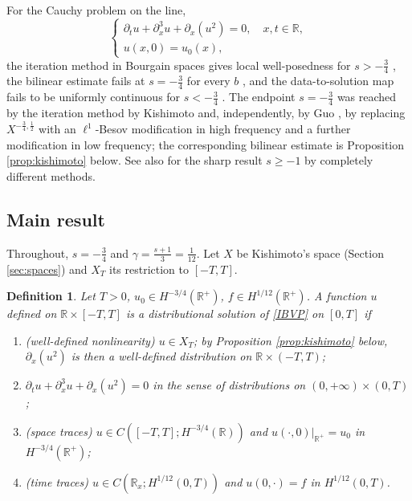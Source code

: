 \documentclass[10pt,reqno]{amsart}
\newtheorem{definition}[theorem]{Definition}
\theoremstyle{remark}
\numberwithin{equation}{section}
\newcommand{\R}{\mathbb R}
\newcommand{\pd}{\partial}
\newcommand{\ga}{\gamma}
\begin{document}
For the Cauchy problem on the line,
\begin{equation}\label{pure}
\left\{\begin{array}{l}
\partial_{t} u+\partial_{x}^{3} u+\pd_x( u^2)=0, \quad x, t \in \mathbb{R},  \\
u(x, 0)=u_{0}(x),
\end{array}\right.
\end{equation}
the iteration method in Bourgain spaces gives local well-posedness for $s>-\frac34$ \cite{KPV96}, the bilinear estimate fails at $s=-\frac34$ for every $b$ \cite{NTT}, and the data-to-solution map fails to be uniformly continuous for $s<-\frac34$ \cite{CCT}. The endpoint $s=-\frac34$ was reached by the iteration method by Kishimoto \cite{Kishimoto} and, independently, by Guo \cite{Guo}, by replacing $X^{-\frac34,\frac12}$ with an $\ell^1$-Besov modification in high frequency and a further modification in low frequency; the corresponding bilinear estimate is Proposition \ref{prop:kishimoto} below. See also \cite{Killip} for the sharp result $s\ge-1$ by completely different methods.

\subsection{Main result}

Throughout, $s=-\frac34$ and $\ga=\frac{s+1}{3}=\frac1{12}$. Let $X$ be Kishimoto's space (Section \ref{sec:spaces}) and $X_T$ its restriction to $[-T,T]$.

\begin{definition}\label{def:solution}
Let $T>0$, $u_0\in H^{-3/4}(\R^+)$, $f\in H^{1/12}(\R^+)$. A function $u$ defined on $\R\times[-T,T]$ is a \emph{distributional solution} of \eqref{IBVP} on $[0,T]$ if
\begin{enumerate}
\item[(a)] (\emph{well-defined nonlinearity}) $u\in X_T$; by Proposition \ref{prop:kishimoto} below, $\pd_x(u^2)$ is then a well-defined distribution on $\R\times(-T,T)$;
\item[(b)] $\pd_t u+\pd_x^3u+\pd_x(u^2)=0$ in the sense of distributions on $(0,+\infty)\times(0,T)$;
\item[(c)] (\emph{space traces}) $u\in C([-T,T];H^{-3/4}(\R))$ and $u(\cdot,0)|_{\R^+}=u_0$ in $H^{-3/4}(\R^+)$;
\item[(d)] (\emph{time traces}) $u\in C(\R_x;H^{1/12}(0,T))$ and $u(0,\cdot)=f$ in $H^{1/12}(0,T)$.
\end{enumerate}
\end{definition}
\end{document}
